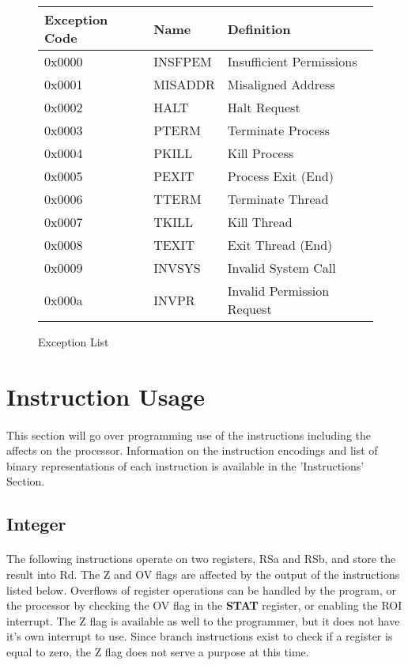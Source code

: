 \documentclass[letterpaper, 11pt]{article}
\begin{document}
\begin{figure}[!h]
	\begin{center}
		\begin{tabular}{|l|l|l|}
			\hline
			Exception Code 		& Name		& Definition						\\ \hline
			0x0000 				& INSFPEM	& Insufficient Permissions 			\\ \hline
			0x0001 				& MISADDR	& Misaligned Address	 			\\ \hline
			0x0002 				& HALT		& Halt Request			 			\\ \hline
			0x0003 				& PTERM		& Terminate Process		 			\\ \hline
			0x0004 				& PKILL		& Kill Process			 			\\ \hline
			0x0005				& PEXIT		& Process Exit (End)				\\ \hline
			0x0006				& TTERM		& Terminate Thread					\\ \hline
			0x0007				& TKILL		& Kill Thread						\\ \hline
			0x0008				& TEXIT		& Exit Thread (End)					\\ \hline
			0x0009				& INVSYS	& Invalid System Call				\\ \hline
			0x000a				& INVPR		& Invalid Permission Request		\\ \hline
		\end{tabular} 
		\caption{Exception List}
	\end{center}
	
\end{figure} 



\clearpage
\section{Instruction Usage}
\paragraph{}This section will go over programming use of the instructions including the affects on the processor. Information on the 
instruction encodings and list of binary representations of each instruction is available in the 'Instructions' Section.
\subsection{Integer}
\paragraph{} The following instructions operate on two registers, RSa and RSb, and store the result into Rd. The Z and OV flags are affected
by the output of the instructions listed below. Overflows of register operations can be handled by the program, or the processor by checking the
OV flag in the \textbf{STAT} register, or enabling the ROI interrupt. The Z flag is available as well to the programmer, but it does not have
it's own interrupt to use. Since branch instructions exist to check if a register is equal to zero, the Z flag does not serve a purpose at this time.
\end{document}

